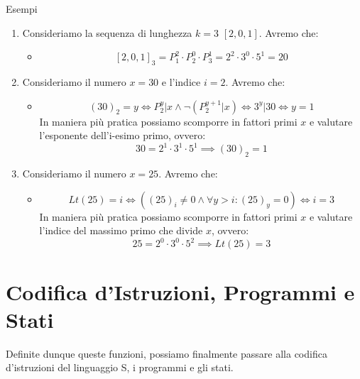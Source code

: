 \begin{generalbox}[colframe=azure-gradient-3!90!black]{Esempi}
  \begin{enumerate}
    \item Consideriamo la sequenza di lunghezza \(k=3\) \([2,0,1]\). Avremo che:
    \begin{itemize}
      \item [] \begin{equation}
        {[2,0,1]}_3=P_1^2\cdot P_2^0\cdot P_3^1=2^2\cdot 3^0\cdot 5^1=20
      \end{equation}
    \end{itemize}
    \item Consideriamo il numero \(x=30\) e l'indice \(i=2\). Avremo che:
    \begin{itemize}
      \item [] \begin{equation}
        {(30)}_2=y \iff P_2^y \vert x \land \neg(P_2^{y+1} \vert x) \iff 3^y \vert 30 \iff y=1
      \end{equation}
      In maniera più pratica possiamo scomporre in fattori primi \(x\) e valutare l'esponente dell'i-esimo primo, ovvero:
      \begin{equation}
        30=2^1\cdot 3^1\cdot 5^1 \implies {(30)}_2=1
      \end{equation}
    \end{itemize}
    \item Consideriamo il numero \(x=25\). Avremo che:
    \begin{itemize}
      \item [] \begin{equation}
        Lt(25)=i \iff \left({(25)}_i\neq 0 \land \forall y > i: {(25)}_y= 0 \right)\iff i=3
      \end{equation}
      In maniera più pratica possiamo scomporre in fattori primi \(x\) e valutare l'indice del massimo primo che divide \(x\), ovvero:
      \begin{equation}
        25=2^0\cdot 3^0\cdot 5^2 \implies Lt(25)=3
      \end{equation}
    \end{itemize}
  \end{enumerate}
\end{generalbox}

\section{Codifica d'Istruzioni, Programmi e Stati}
Definite dunque queste funzioni, possiamo finalmente passare alla codifica d'istruzioni del linguaggio S, i programmi e gli stati.

